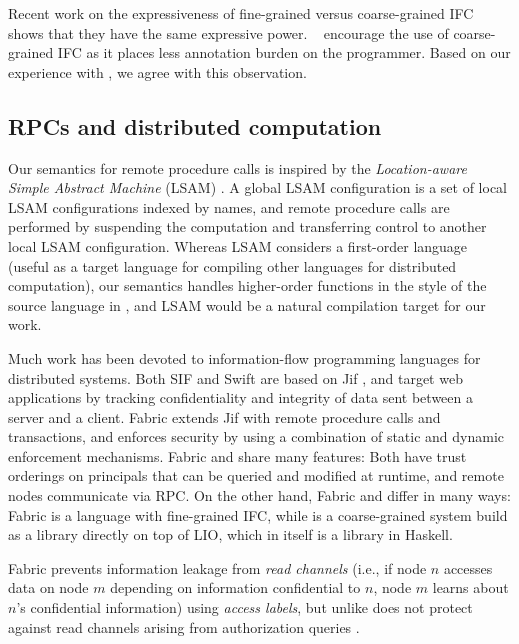 Recent work \cite{Rajani2018, Vassena2019} on the expressiveness of fine-grained versus coarse-grained IFC shows that they have the same expressive power. \citeauthor{Rajani2018}~\cite{Rajani2018} encourage the use of coarse-grained IFC as it places less annotation burden on the programmer. Based on our experience with \lang{}, we agree with this observation.

\subsection{RPCs and distributed computation}
Our semantics for remote procedure calls is inspired by the \emph{Location-aware Simple Abstract Machine} (LSAM) \cite{10.1007/978-3-642-25462-8_28}. A global LSAM configuration is a set of local LSAM configurations indexed by names, and remote procedure calls are performed by suspending the computation and transferring control to another local LSAM configuration. Whereas LSAM considers a first-order language (useful as a target language for compiling other languages for distributed computation), our semantics handles higher-order functions in the style of the source language in \cite{Cooper:2009:RC:1599410.1599439}, and LSAM would be a natural compilation target for our work.

Much work has been devoted to information-flow programming languages for distributed systems. Both SIF \cite{Chong:2007:SEC:1362903.1362904} and Swift \cite{Chong:2007:SWA:1294261.1294265} are based on Jif \cite{Myers:1999:JPM:292540.292561}, and target web applications by tracking confidentiality and integrity of data sent between a server and a client. Fabric \cite{Liu:2009:FPS:1629575.1629606} extends Jif with remote procedure calls and transactions, and enforces security by using a combination of static and dynamic enforcement mechanisms. Fabric and \lang{} share many features: Both have trust orderings on principals that can be queried and modified at runtime, and remote nodes communicate via RPC. On the other hand, Fabric and \lang{} differ in many ways: Fabric is a language with fine-grained IFC, while \lang{} is a coarse-grained system build as a library directly on top of LIO, which in itself is a library in Haskell.

Fabric prevents information leakage from \emph{read channels} (i.e., if node $n$ accesses data on node $m$ depending on information confidential to $n$, node $m$ learns about $n$'s confidential information) using \emph{access labels}, but unlike \lang does not protect against read channels arising from authorization queries \cite{Arden:2015:FA:2859845.2859998}.